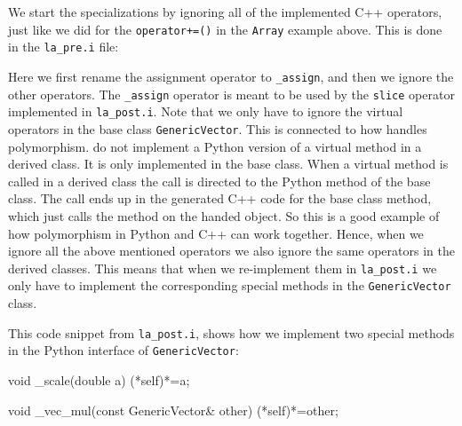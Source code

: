 \begin{code}
We start the specializations by ignoring all of the implemented C++ operators, just like we did for the \texttt{operator+=()} in the \texttt{Array} example above. This is done in the \texttt{la\_pre.i} file:
\begin{code}
\end{code}
Here we first rename the assignment operator to \texttt{\_assign}, and then we ignore the other operators. The \texttt{\_assign} operator is meant to be used by the \texttt{slice} operator implemented in \texttt{la\_post.i}. Note that we only have to ignore the virtual operators in the base class \texttt{GenericVector}. This is connected to how \swig handles polymorphism. \swig do not implement a Python version of a virtual method in a derived class. It is only implemented in the base class. When a virtual method is called in a derived class the call is directed to the Python method of the base class. The call ends up in the \swig generated C++ code for the base class method, which just calls the method on the handed object. So this is a good example of how polymorphism in Python and C++ can work together. Hence, when we ignore all the above mentioned operators we also ignore the same operators in the derived classes. This means that when we re-implement them in \texttt{la\_post.i} we only have to implement the corresponding special methods in the \texttt{GenericVector} class. \par

This code snippet from \texttt{la\_post.i}, shows how we implement two special methods in the Python interface of \texttt{GenericVector}:
\begin{code}
  void _scale(double a)
  {(*self)*=a;}
  
  void _vec_mul(const GenericVector& other)
  {(*self)*=other;}


\end{code}
\end{code}
